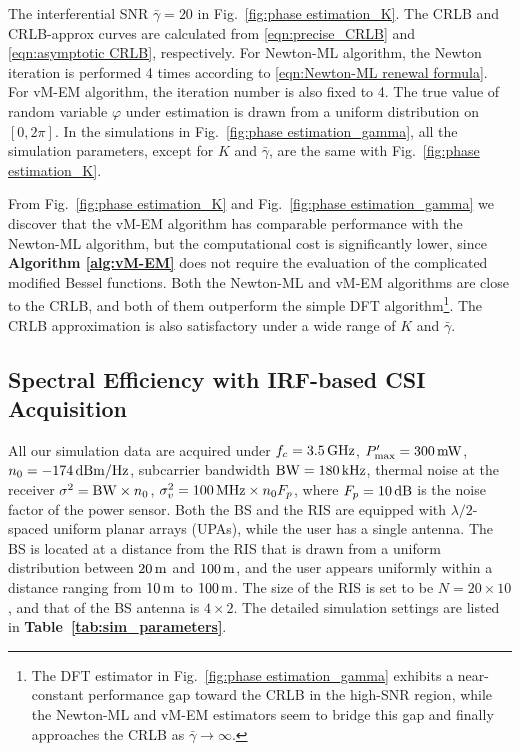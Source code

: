 \documentclass[journal,twocolumn]{IEEEtran}
\theoremstyle{nonumberplain}
\begin{document}
    The interferential SNR $\bar{\gamma}=20$ in Fig.~\ref{fig:phase estimation_K}. 
    The CRLB and CRLB-approx curves are calculated from \eqref{eqn:precise_CRLB} and \eqref{eqn:asymptotic CRLB}, respectively. 
    For Newton-ML algorithm, the Newton iteration is performed 4 times according to \eqref{eqn:Newton-ML renewal formula}. 
    For vM-EM algorithm, the iteration number is also fixed to 4. The true value of random variable $\varphi$ under estimation is drawn from a uniform distribution on $[0,2\pi]$. 
    In the simulations in Fig.~\ref{fig:phase estimation_gamma}, all the simulation parameters, except for $K$ and $\bar{\gamma}$, are the same with Fig.~\ref{fig:phase estimation_K}.

    From Fig.~\ref{fig:phase estimation_K} and Fig.~\ref{fig:phase estimation_gamma} we discover that the vM-EM algorithm has comparable performance with the Newton-ML algorithm, but the computational cost is significantly lower, since {\bf Algorithm \ref{alg:vM-EM}} does not require the evaluation of the complicated modified Bessel functions. 
    Both the Newton-ML and vM-EM algorithms are close to the CRLB, and both of them outperform the simple DFT algorithm\footnote{The DFT estimator in Fig.~\ref{fig:phase estimation_gamma} exhibits a near-constant performance gap toward the CRLB in the high-SNR region, while the Newton-ML and vM-EM estimators seem to bridge this gap and finally approaches the CRLB as $\bar{\gamma}\to\infty$.}. 
    The CRLB approximation is also satisfactory under a wide range of $K$ and $\bar{\gamma}$. 

\subsection{Spectral Efficiency with IRF-based CSI Acquisition} \label{Achievable Spectral Efficiency under IRF}

    All our simulation data are acquired under $f_c = 3.5\,{\rm GHz}$, $P_{\rm max}'=300 \,{\rm mW}$, $n_0=-174\,{\rm dBm/Hz}$, subcarrier bandwidth ${\rm BW} = 180\,{\rm kHz}$, thermal noise at the receiver $\sigma^2 = {\rm BW}\times n_0$, $\sigma_v^2=100\,{\rm MHz}\times n_0 F_p$, where $F_p=10\,{\rm dB}$ is the noise factor of the power sensor. 
    Both the BS and the RIS are equipped with $\lambda/2$-spaced uniform planar arrays (UPAs), while the user has a single antenna. 
    The BS is located at a distance from the RIS that is drawn from a uniform distribution between $20\,{\rm m}$ and $100\,{\rm m}$, and the user appears uniformly within a distance ranging from $10\,{\rm m}$ to $100\,{\rm m}$.
    The size of the RIS is set to be $N=20\times 10$, and that of the BS antenna is $4\times 2$. The detailed simulation settings are listed in {\bf Table~\ref{tab:sim_parameters}}.
    
\end{document}
